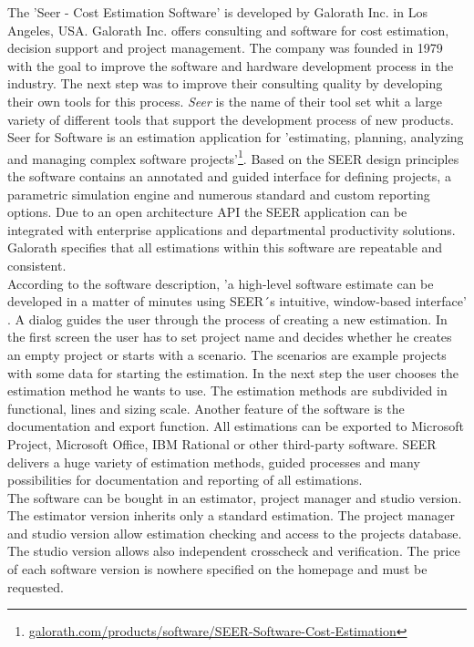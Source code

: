The 'Seer - Cost Estimation Software' is developed by Galorath Inc. in Los Angeles, USA. Galorath Inc. offers consulting and software for cost estimation, decision support and project management. The company was founded in 1979 with the goal to improve the software and hardware development process in the industry. The next step was to improve their consulting quality by developing their own tools for this process. \textit{Seer} is the name of their tool set whit a large variety of different tools that support the development process of new products.
\\
Seer for Software is an estimation application for 'estimating, planning, analyzing and managing complex software projects'\footnote{\url{galorath.com/products/software/SEER-Software-Cost-Estimation}}. Based on the SEER design principles the software contains an annotated and guided interface for defining projects, a parametric simulation engine and numerous standard and custom reporting options. Due to an open architecture API the SEER application can be integrated with enterprise applications and departmental productivity solutions. Galorath specifies that all estimations within this software are repeatable and consistent.
\\
According to the software description, 'a high-level software estimate can be developed in a matter of minutes using SEER´s intuitive, window-based interface' \cite{pricesystems}. A dialog guides the user through the process of creating a new estimation. In the first screen the user has to set project name and decides whether he creates an empty project or starts with a scenario. The scenarios are example projects with some data for starting the estimation. In the next step the user chooses the estimation method he wants to use. The estimation methods are subdivided in functional, lines and sizing scale. Another feature of the software is the documentation and export function. All estimations can be exported to Microsoft Project, Microsoft Office, IBM Rational or other third-party software. SEER delivers a huge variety of estimation methods, guided processes and many possibilities for documentation and reporting of all estimations.
\\
The software can be bought in an estimator, project manager and studio version. The estimator version inherits only a standard estimation. The project manager and studio version allow estimation checking and access to the projects database. The studio version allows also independent crosscheck and verification. The price of each software version is nowhere specified on the homepage and must be requested.

